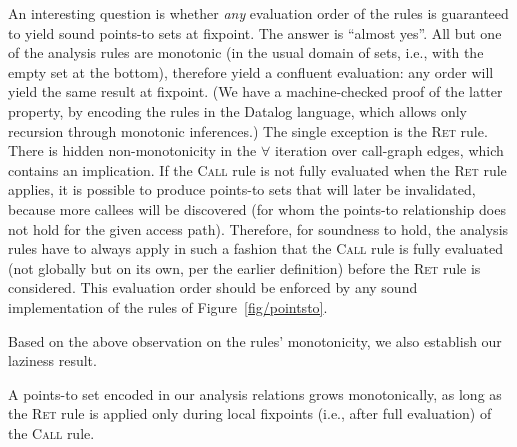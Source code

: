 An interesting question is whether \emph{any} evaluation order of the
  rules is guaranteed to yield sound points-to sets at fixpoint. The
answer is ``almost yes''. All but one of the analysis rules are monotonic (in
the usual domain of sets, i.e., with the empty set at the bottom),
therefore yield a confluent evaluation: any order will yield the same
result at fixpoint. (We have a machine-checked proof of the latter property,
by encoding the rules in the Datalog language,
which allows only recursion through monotonic inferences.)
The single exception is the \textsc{Ret}
rule. There is hidden non-monotonicity in the \(\forall\) iteration
over call-graph edges, which contains an implication.
If the \textsc{Call} rule is not fully
evaluated when the \textsc{Ret} rule applies, it is possible to
produce points-to sets that will later be invalidated, because more
callees will be discovered (for whom the points-to relationship does
not hold for the given access path).  Therefore, for soundness to
hold, the analysis rules have to always apply in such a fashion that
the \textsc{Call} rule is fully evaluated (not globally but on its
own, per the earlier definition) before the \textsc{Ret} rule is
considered. This evaluation order should be enforced by any sound
implementation of the rules of Figure~\ref{fig/pointsto}.

Based on the above observation on the rules' monotonicity, we
also establish our laziness result.

\begin{theorem}
  A points-to set encoded in our analysis relations grows
  monotonically, as long as the \textsc{Ret} rule is applied only
  during local fixpoints (i.e., after full evaluation) of the
  \textsc{Call} rule.
\end{theorem}




